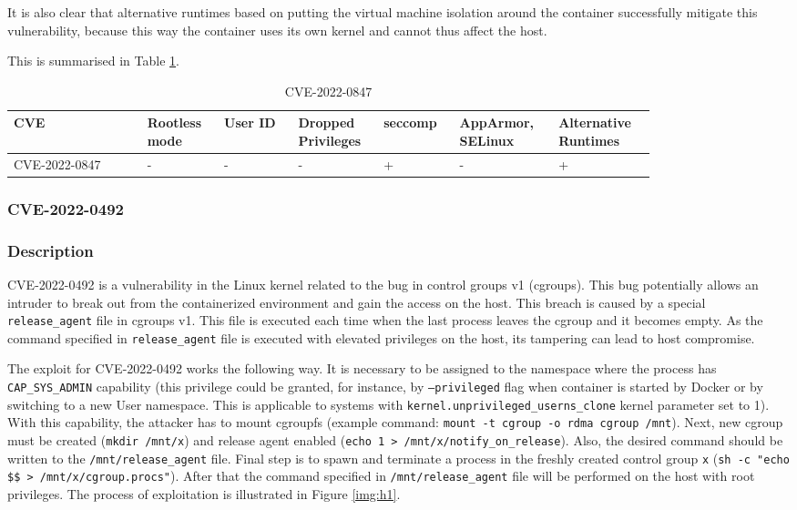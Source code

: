 It is also clear that alternative runtimes based on putting the virtual machine isolation around the container successfully mitigate this vulnerability, because this way the container uses its own kernel and cannot thus affect the host. 

This is summarised in Table \ref{tab:h:1}.

\begin{table}[H]
    \centering \small
    \begin{tabular}{| p{0.18\linewidth} | p{0.1\linewidth} | p{0.1\linewidth} | p{0.1\linewidth} | p{0.1\linewidth} | p{0.12\linewidth} | p{0.12\linewidth} |} \hline
    CVE & Rootless mode & User ID & Dropped Privileges & seccomp & AppArmor, SELinux & Alternative Runtimes \\ \hline
    CVE-2022-0847 & - & - & - & \cellcolor{green!25} + & - & \cellcolor{green!25} +  \\ \hline
    \end{tabular}
    \caption{CVE-2022-0847}
    \label{tab:h:1}
\end{table}


\subsubsection{CVE-2022-0492}

\subsubsection*{Description}

CVE-2022-0492 is a vulnerability in the Linux kernel related to the bug in control groups v1 (cgroups). This bug potentially allows an intruder to break out from the containerized environment and gain the access on the host. This breach is caused by a special \texttt{release\_agent} file in cgroups v1. This file is executed each time when the last process leaves the cgroup and it becomes empty. As the command specified in \texttt{release\_agent} file is executed with elevated privileges on the host, its tampering can lead to host compromise.

The exploit for CVE-2022-0492 works the following way. It is necessary to be assigned to the namespace where the process has \texttt{CAP\_SYS\_ADMIN} capability (this privilege could be granted, for instance, by \texttt{--privileged} flag when container is started by Docker or by switching to a new User namespace. This is applicable to systems with \texttt{kernel.unprivileged\_userns\_clone} kernel parameter set to 1). With this capability, the attacker has to mount cgroupfs (example command: \texttt{mount -t cgroup -o rdma cgroup /mnt}). Next, new cgroup must be created (\texttt{mkdir /mnt/x}) and release agent enabled (\texttt{echo 1 > /mnt/x/notify\_on\_release}). Also, the desired command should be written to the \texttt{/mnt/release\_agent} file. Final step is to spawn and terminate a process in the freshly created control group \texttt{x} (\texttt{sh -c "echo \$\$ > /mnt/x/cgroup.procs"}). After that the command specified in \texttt{/mnt/release\_agent} file will be performed on the host with root privileges. The process of exploitation is illustrated in Figure \ref{img:h1}.

